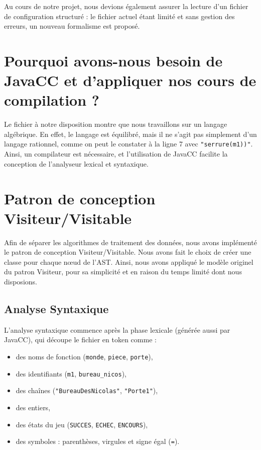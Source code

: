 Au cours de notre projet, nous devions également assurer la lecture d’un fichier de configuration structuré : le fichier actuel étant limité et sans gestion des erreurs, un nouveau formalisme est proposé.

\section{Pourquoi avons-nous besoin de JavaCC et d'appliquer nos cours de compilation ?}

Le fichier à notre disposition montre que nous travaillons sur un langage algébrique. En effet, le langage est équilibré, mais il ne s’agit pas simplement d’un langage rationnel, comme on peut le constater à la ligne 7 avec \texttt{"serrure(m1))"}. Ainsi, un compilateur est nécessaire, et l’utilisation de JavaCC facilite la conception de l’analyseur lexical et syntaxique.

\section{Patron de conception Visiteur/Visitable}

Afin de séparer les algorithmes de traitement des données, nous avons implémenté le patron de conception Visiteur/Visitable. Nous avons fait le choix de créer une classe pour chaque nœud de l’AST. Ainsi, nous avons appliqué le modèle originel du patron Visiteur, pour sa simplicité et en raison du temps limité dont nous disposions.

\subsection{Analyse Syntaxique}

L'analyse syntaxique commence après la phase lexicale (générée aussi par JavaCC), qui découpe le fichier en token comme :
\begin{itemize}
    \item des noms de fonction (\texttt{monde}, \texttt{piece}, \texttt{porte}),
    \item des identifiants (\texttt{m1}, \texttt{bureau\_nicos}),
    \item des chaînes (\texttt{"BureauDesNicolas"}, \texttt{"Porte1"}),
    \item des entiers,
    \item des états du jeu (\texttt{SUCCES}, \texttt{ECHEC}, \texttt{ENCOURS}),
    \item des symboles : parenthèses, virgules et signe égal (\texttt{=}).
\end{itemize}

